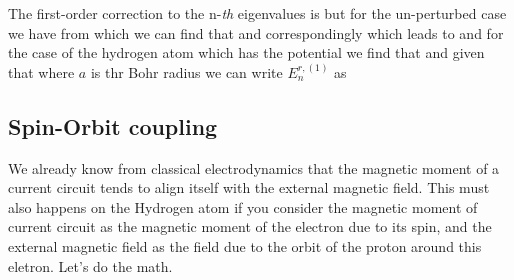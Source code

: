 \documentclass[oneside, 12pt, notitlepage]{book}
\begin{document}
The first-order correction to the n-\emph{th} eigenvalues is
but for the un-perturbed case we have
from which we can find that
and correspondingly
which leads to
and for the case of the hydrogen atom which has the potential
we find that
and given that
where \(a\) is thr Bohr radius
we can write \(E_n^{r,{(1)}}\) as
\par

\subsection{Spin-Orbit coupling}

We already know from classical electrodynamics that the magnetic moment of a current circuit tends to align itself with the external magnetic field. This must also happens on the Hydrogen atom if you consider the magnetic moment of current circuit as the magnetic moment of the electron due to its spin, and the external magnetic field as the field due to the orbit of the proton around this eletron. Let's do the math.\par
\end{document}
